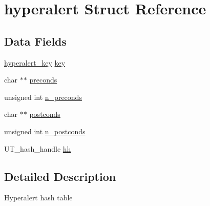 \hypertarget{structhyperalert}{
\section{hyperalert Struct Reference}
\label{structhyperalert}
}
\subsection*{Data Fields}
\begin{DoxyCompactItemize}
\item 
\hyperlink{structhyperalert__key}{hyperalert\_\-key} \hyperlink{structhyperalert_a592c41f4772230c065ce352ec6c6cf0d}{key}
\item 
char $\ast$$\ast$ \hyperlink{structhyperalert_afa2862b9a574be52e5dc4a4cc0178d66}{preconds}
\item 
unsigned int \hyperlink{structhyperalert_a84181558bdbb98e49087d4ce7353bf70}{n\_\-preconds}
\item 
char $\ast$$\ast$ \hyperlink{structhyperalert_a69e0ed6e53e6fe23d3de2ec1f5d13863}{postconds}
\item 
unsigned int \hyperlink{structhyperalert_a16c46535e62397b5ef394b014943f58a}{n\_\-postconds}
\item 
UT\_\-hash\_\-handle \hyperlink{structhyperalert_aa2993f19f3cc95627cfdaf4f47f78b04}{hh}
\end{DoxyCompactItemize}


\subsection{Detailed Description}
Hyperalert hash table 

